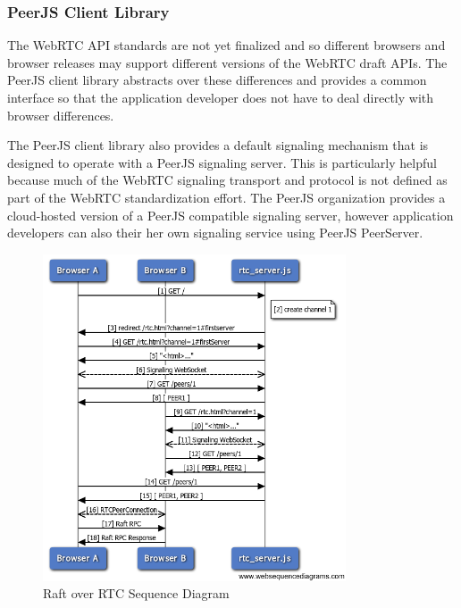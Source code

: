 \documentclass[9pt]{extarticle}
\begin{document}
\begin{multicols}{2}
\subsubsection{PeerJS Client Library}

The WebRTC API standards are not yet
finalized and so different browsers and browser releases may support
different versions of the WebRTC draft APIs. %
The PeerJS client library abstracts over these differences and
provides a common interface so that the application developer does not
have to deal directly with browser differences.

The PeerJS client library also provides a default signaling mechanism
that is designed to operate with a PeerJS signaling server. This is
particularly helpful because much of the WebRTC signaling transport
and protocol is not defined as part of the WebRTC standardization
effort. %
The PeerJS organization provides a cloud-hosted version of a PeerJS
compatible signaling server, however application developers can also
their her own signaling service using PeerJS PeerServer.


\end{multicols}

\begin{figure}[h]
\centerline{\includegraphics[width=0.8\textwidth]{imgs/raft_rtc_sequence}}
\caption{Raft over RTC Sequence Diagram}
  \label{fig:raft_rtc_sequence}
\end{figure}
\end{document}
